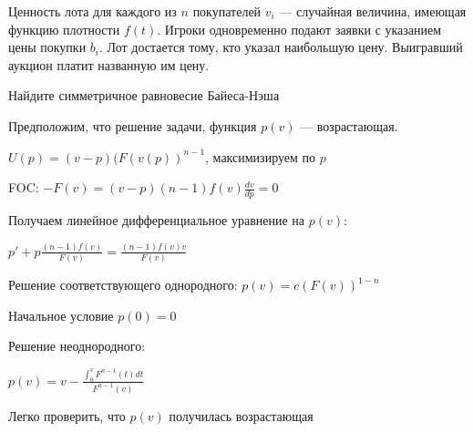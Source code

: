 \begin{problem}
Ценность лота для каждого из $n$ покупателей  $v_{i} $  --- случайная величина, имеющая функцию плотности $f(t)$. Игроки одновременно подают заявки с указанием цены покупки  $b_{i}$. Лот достается тому, кто указал наибольшую цену. Выигравший аукцион платит названную им цену. \par
Найдите симметричное равновесие Байеса-Нэша

\begin{sol}

Предположим, что решение задачи, функция $p(v)$ --- возрастающая. \par
$U(p)=(v-p)(F(v(p))^{n-1}$, максимизируем по $p$ \par
FOC: $-F(v)=(v-p)(n-1)f(v)\frac{dv}{dp}=0$ \par
Получаем линейное дифференциальное уравнение на $p(v)$: \par
$p'+p\frac{(n-1)f(v)}{F(v)}=\frac{(n-1)f(v)v}{F(v)}$ \par
Решение соответствующего однородного: $p(v)=c(F(v))^{1-n}$ \par
Начальное условие $p(0)=0$ \par
Решение неоднородного: \par
$p(v)=v-\frac{\int_{0}^{v}F^{n-1}(t)dt}{F^{n-1}(v)}$ \par
Легко проверить, что $p(v)$ получилась возрастающая
\end{sol}
\end{problem}



